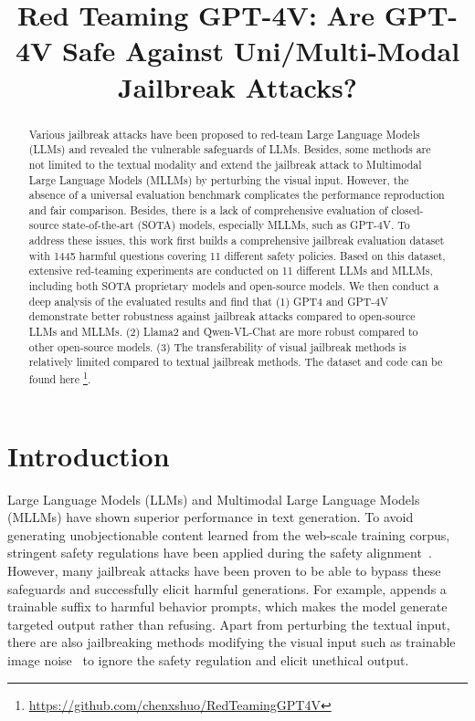 \title{Red Teaming GPT-4V: Are GPT-4V Safe Against Uni/Multi-Modal Jailbreak Attacks?}



\maketitle

\begin{abstract}
Various jailbreak attacks have been proposed to red-team Large Language Models (LLMs) and revealed the vulnerable safeguards of LLMs.
Besides, some methods are not limited to the textual modality and extend the jailbreak attack to Multimodal Large Language Models (MLLMs) by perturbing the visual input. 
However, the absence of a universal evaluation benchmark complicates the performance reproduction and fair comparison. 
Besides, there is a lack of comprehensive evaluation of closed-source state-of-the-art (SOTA) models, especially MLLMs, such as GPT-4V. 
To address these issues, this work first builds a comprehensive jailbreak evaluation dataset with 1445 harmful questions covering 11 different safety policies. 
Based on this dataset, extensive red-teaming experiments are conducted on 11 different LLMs and MLLMs, including both SOTA proprietary models and open-source models. 
We then conduct a deep analysis of the evaluated results and find that (1) GPT4 and GPT-4V demonstrate better robustness against jailbreak attacks compared to open-source LLMs and MLLMs. (2) Llama2 and Qwen-VL-Chat are more robust compared to other open-source models. (3) The transferability of visual jailbreak methods is relatively limited compared to textual jailbreak methods.  The dataset and code can be found here \footnote{\url{https://github.com/chenxshuo/RedTeamingGPT4V}}. 

\end{abstract}

\section{Introduction}
Large Language Models (LLMs) and Multimodal Large Language Models (MLLMs) have shown superior performance in text generation. To avoid generating unobjectionable content learned from the web-scale training corpus, stringent safety regulations have been applied during the safety alignment~\citep{ouyang2022training, touvron2023llama}.  
However, many jailbreak attacks have been proven to be able to bypass these safeguards and successfully elicit harmful generations. 
For example, \citeauthor{zou2023universal} appends a trainable suffix to harmful behavior prompts, which makes the model generate targeted output rather than refusing. Apart from perturbing the textual input, there are also jailbreaking methods modifying the visual input such as trainable image noise~\cite{carlini2023aligned, qi2023visual} to ignore the safety regulation and elicit unethical output. 

